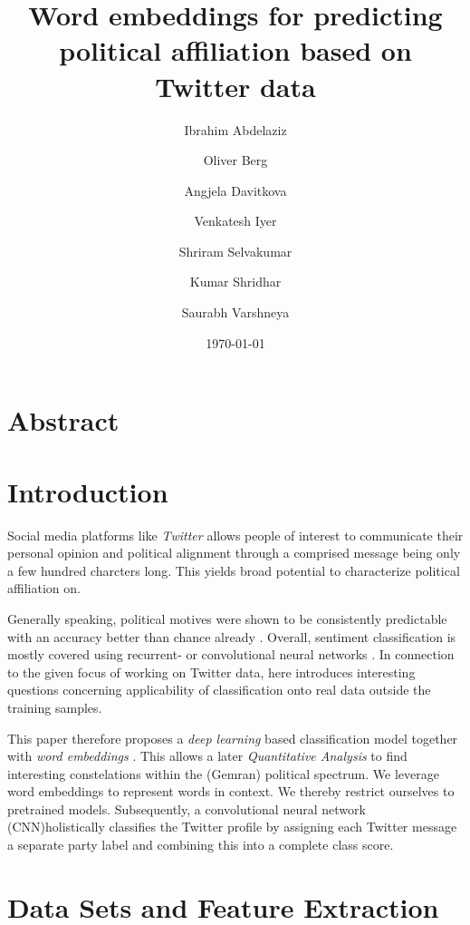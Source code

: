 \documentclass[10pt, oneside]{article}
\title{Word embeddings for predicting political affiliation based on Twitter data}
\author[]{Ibrahim Abdelaziz}
\author[]{Oliver Berg}
\author[]{Angjela Davitkova}
\author[]{Venkatesh Iyer}
\author[]{Shriram Selvakumar}
\author[]{Kumar Shridhar}
\author[]{Saurabh Varshneya}
\affil[1]{Technische Universität Kaiserslautern}
\date{\today}
\begin{document}
\maketitle
\begin{multicols}{2}


\section{Abstract}



\section{Introduction}

Social media platforms like \emph{Twitter} allows people of interest to communicate their personal opinion and political alignment through a comprised message being only a few hundred charcters long. This yields broad potential to characterize political affiliation on.

Generally speaking, political motives were shown to be consistently predictable with an accuracy better than chance already \cite{Biessmann2017}. Overall, sentiment classification is mostly covered using recurrent- or convolutional neural networks \cite{Kim2014}. In connection to the given focus of working on Twitter data, \cite{Cohen2013} here introduces interesting questions concerning applicability of classification onto real data outside the training samples.

This paper therefore proposes a \emph{deep learning} based classification model together with \emph{word embeddings} \cite{Pelevinala2016}. This allows a later \emph{Quantitative Analysis} to find interesting constelations within the (Gemran) political spectrum.
We leverage word embeddings to represent words in context. We thereby restrict ourselves to pretrained models. Subsequently, a convolutional neural network (CNN)holistically classifies the Twitter profile by assigning each Twitter message a separate party label and combining this into a complete class score.  


\section{Data Sets and Feature Extraction} 



\end{multicols}
\end{document}

